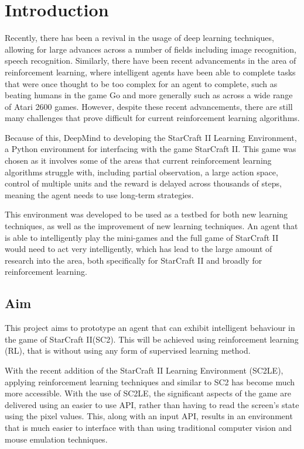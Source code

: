 \chapter{Introduction}%
\label{intro}

Recently, there has been a revival in the usage of deep
learning\cite{lecun2015deep} techniques, allowing for large advances across
a number of fields including image recognition\cite{krizhevsky2012imagenet},
speech recognition\cite{graves2013speech, hinton2012deep}. Similarly,
there have been recent advancements in the area of reinforcement learning,
where intelligent agents have been able to complete tasks that were once thought
to be too complex for an agent to complete, such as beating humans in the game
Go\cite{silver2016mastering} and more generally such as across a wide range of
Atari 2600 games\cite{mnih2015human}. However, despite these recent advancements,
there are still many challenges that prove difficult for current
reinforcement learning algorithms.

Because of this, DeepMind\cite{deepmind} to developing the
StarCraft II Learning Environment\cite{vinyals2017starcraft}, a Python
environment for interfacing with the game StarCraft II\cite{pysc2, starcraft2}.
This game was chosen as it involves some of the areas that current reinforcement
learning algorithms struggle with, including partial observation, a large action
space, control of multiple units and the reward is delayed across thousands of
steps, meaning the agent needs to use long-term strategies.

This environment was developed to be used as a testbed for both new learning
techniques, as well as the improvement of new learning techniques. An agent
that is able to intelligently play the mini-games and the full game of
StarCraft II would need to act very intelligently, which has lead to the large
amount of research into the area, both specifically for StarCraft II and
broadly for reinforcement learning.

\section{Aim}

This project aims to prototype an agent that can exhibit intelligent behaviour
in the game of StarCraft II\@ (SC2). This will be achieved using reinforcement
learning (RL), that is without using any form of supervised learning method.

With the recent addition of the StarCraft II Learning Environment (SC2LE),
applying reinforcement learning techniques and similar to SC2 has become much
more accessible. With the use of SC2LE, the significant aspects of the game are
delivered using an easier to use API, rather than having to read the screen's
state using the pixel values. This, along with an input API, results in an
environment that is much easier to interface with than using traditional
computer vision and mouse emulation techniques.

